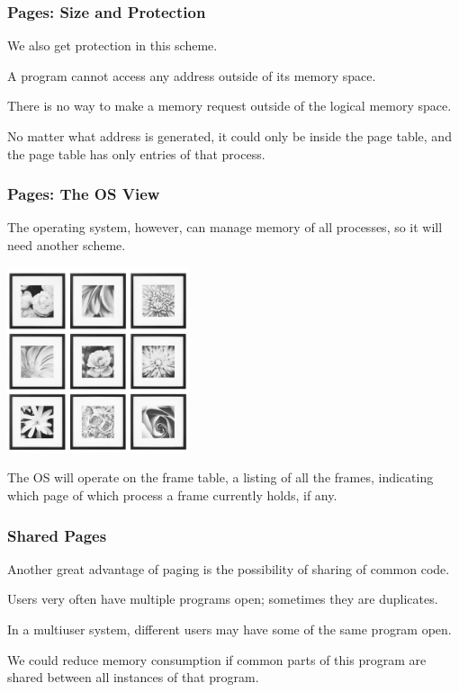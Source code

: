 \begin{frame}
\frametitle{Pages: Size and Protection}

We also get protection in this scheme.

A program cannot access any address outside of its memory space. 

There is no way to make a memory request outside of the logical memory space. 

No matter what address is generated, it could only be inside the page table, and the page table has only entries of that process.

\end{frame}

\begin{frame}
\frametitle{Pages: The OS View}

The operating system, however, can manage memory of all processes, so it will need another scheme. 

\begin{center}
	\includegraphics[width=0.4\textwidth]{images/frametable.png}
\end{center}

The OS will operate on the \alert{frame table}, a listing of all the frames, indicating which page of which process a frame currently holds, if any.


\end{frame}

\begin{frame}
\frametitle{Shared Pages}

Another great advantage of paging is the possibility of sharing of common code. 

Users very often have multiple programs open; sometimes they are duplicates.

In a multiuser system, different users may have some of the same program open.

We could reduce memory consumption if common parts of this program are shared between all instances of that program.

\end{frame}


